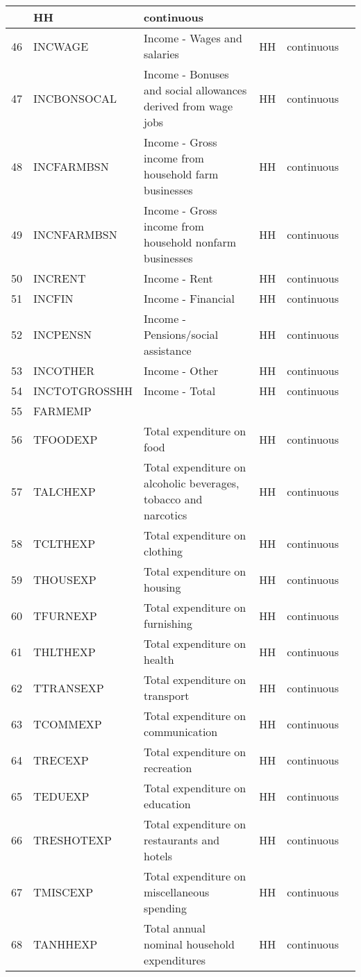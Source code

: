 \documentclass[letterpaper,10pt,english]{sphinxmanual}
\begin{document}
\begin{savenotes}
\begin{longtable}[c]{|l|l|l|l|l|l|}
&
HH
&
continuous
&\\
\hline
46
&
INCWAGE
&
Income - Wages and salaries
&
HH
&
continuous
&\\
\hline
47
&
INCBONSOCAL
&
Income - Bonuses and social
allowances derived from wage jobs
&
HH
&
continuous
&\\
\hline
48
&
INCFARMBSN
&
Income - Gross income
from household farm businesses
&
HH
&
continuous
&\\
\hline
49
&
INCNFARMBSN
&
Income - Gross income from
household nonfarm businesses
&
HH
&
continuous
&\\
\hline
50
&
INCRENT
&
Income - Rent
&
HH
&
continuous
&\\
\hline
51
&
INCFIN
&
Income - Financial
&
HH
&
continuous
&\\
\hline
52
&
INCPENSN
&
Income - Pensions/social assistance
&
HH
&
continuous
&\\
\hline
53
&
INCOTHER
&
Income - Other
&
HH
&
continuous
&\\
\hline
54
&
INCTOTGROSSHH
&
Income - Total
&
HH
&
continuous
&\\
\hline
55
&
FARMEMP
&&&&\\
\hline
56
&
TFOODEXP
&
Total expenditure on food
&
HH
&
continuous
&\\
\hline
57
&
TALCHEXP
&
Total expenditure on alcoholic
beverages, tobacco and narcotics
&
HH
&
continuous
&\\
\hline
58
&
TCLTHEXP
&
Total expenditure on clothing
&
HH
&
continuous
&\\
\hline
59
&
THOUSEXP
&
Total expenditure on housing
&
HH
&
continuous
&\\
\hline
60
&
TFURNEXP
&
Total expenditure on furnishing
&
HH
&
continuous
&\\
\hline
61
&
THLTHEXP
&
Total expenditure on health
&
HH
&
continuous
&\\
\hline
62
&
TTRANSEXP
&
Total expenditure on transport
&
HH
&
continuous
&\\
\hline
63
&
TCOMMEXP
&
Total expenditure on communication
&
HH
&
continuous
&\\
\hline
64
&
TRECEXP
&
Total expenditure on recreation
&
HH
&
continuous
&\\
\hline
65
&
TEDUEXP
&
Total expenditure on education
&
HH
&
continuous
&\\
\hline
66
&
TRESHOTEXP
&
Total expenditure on restaurants
and hotels
&
HH
&
continuous
&\\
\hline
67
&
TMISCEXP
&
Total expenditure on
miscellaneous spending
&
HH
&
continuous
&\\
\hline
68
&
TANHHEXP
&
Total annual nominal household
expenditures
&
HH
&
continuous
&\\
\hline
\end{longtable}\sphinxatlongtableend\end{savenotes}
\end{document}

